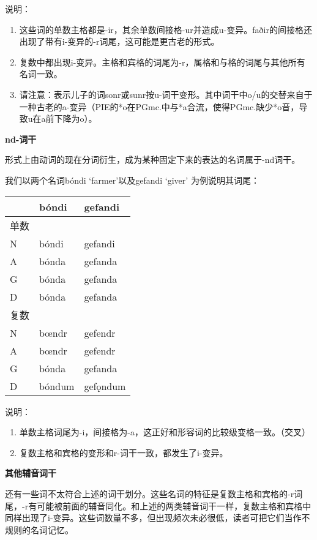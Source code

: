 说明：

\begin{enumerate}
  \def\labelenumi{\arabic{enumi})}
  \item
        这些词的单数主格都是-ir，其余单数间接格-ur并造成u-变异。faðir的间接格还出现了带有i-变异的-r词尾，这可能是更古老的形式。
  \item
        复数中都出现i-变异。主格和宾格的词尾为-r，属格和与格的词尾与其他所有名词一致。
  \item
        请注意：表示儿子的词sonr或sunr按u-词干变形。其中词干中o/u的交替来自于一种古老的a-变异（PIE的*o在PGmc.中与*a合流，使得PGmc.缺少*o音，导致u在a前下降为o）。
\end{enumerate}

\textbf{nd-词干}

形式上由动词的现在分词衍生，成为某种固定下来的表达的名词属于-nd词干。

我们以两个名词bóndi `farmer'以及gefandi `giver' 为例说明其词尾：

\begin{longtable}{lll}
  \toprule
       & bóndi  & gefandi  \\
  \midrule
  \endhead
  \bottomrule
  \endfoot
  单数 &        &          \\
  N    & bóndi  & gefandi  \\
  A    & bónda  & gefanda  \\
  G    & bónda  & gefanda  \\
  D    & bónda  & gefanda  \\
  复数 &        &          \\
  N    & bœndr  & gefendr  \\
  A    & bœndr  & gefendr  \\
  G    & bónda  & gefanda  \\
  D    & bóndum & gefǫndum \\
\end{longtable}

说明：

\begin{enumerate}
  \def\labelenumi{\arabic{enumi})}
  \item
        单数主格词尾为-i，间接格为-a，这正好和形容词的比较级变格一致。（交叉）
  \item
        复数主格和宾格的变形和r-词干一致，都发生了i-变异。
\end{enumerate}

\textbf{其他辅音词干}

还有一些词不太符合上述的词干划分。这些名词的特征是复数主格和宾格的-r词尾，-r有可能被前面的辅音同化。和上述的两类辅音词干一样，复数主格和宾格中同样出现了i-变异。这些词数量不多，但出现频次未必很低，读者可把它们当作不规则的名词记忆。

